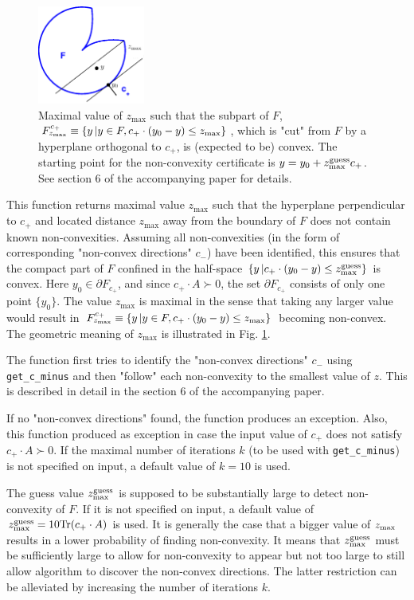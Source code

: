 \documentclass[a4paper]{article}
\theoremstyle{definition}
\begin{document}
\begin{enumerate}
\begin{figure}[H]
	\centering\includegraphics[width=100pt]{fig/get_z_max}
\captionsetup{width=.8\linewidth}
	\caption{Maximal value of $z_{\max}$ such that  the subpart of $F$, $F^{c_+}_{z_{\rm max}}\equiv \{y\, | y\in F, c_+ \cdot (y_0-y)\leq z_{\rm max}\}$, which is "cut" from $F$ by a hyperplane orthogonal  to $c_+$, is (expected to be) convex. The starting point for the non-convexity certificate is $y=y_0+z^{\rm guess}_{\rm max}c_+$. See section 6 of the accompanying paper for details.}
\label{fig:four}
\end{figure}


This function returns maximal value $z_{\max}$ such that the hyperplane perpendicular to $c_+$ and located distance $z_{\max}$ away from the boundary of $F$ does not contain known non-convexities. Assuming all non-convexities (in the form of corresponding "non-convex directions" $c_-$) have been identified, this ensures that the compact part of $F$ confined in the half-space $\{y\, |c_+ \cdot (y_0-y)\leq z^{\rm guess}_{\rm max}\}$ is convex.
Here $y_0\in \partial F_{c_+}$, and since $c_+\cdot A\succ 0$, the set $\partial F_{c_+}$ consists of only one point $\{y_0\}$.
The value $z_{\max}$ is maximal in the sense that taking any larger value would result in $F^{c_+}_{z_{\rm max}}\equiv \{y\, | y\in F, c_+ \cdot (y_0-y)\leq z_{\rm max}\}$ becoming non-convex. The geometric meaning of $z_{\max}$ is illustrated in Fig. \ref{fig:four}. 

The function first tries to identify the "non-convex directions" $c_-$ using {\tt get\_c\_minus} and then "follow" each non-convexity to the smallest value of $z$. This is described in detail in the section 6 of the accompanying paper.

If no "non-convex directions" found, the function produces an exception.
Also, this function produced as exception in case the input value of $c_+$ does not satisfy $c_+\cdot A\succ 0$.
If the maximal number of iterations $k$ (to be used with {\tt get\_c\_minus}) is not specified on input, a default value of $k=10$ is used.

The guess value $z^{\rm guess}_{\rm max}$ is supposed to be substantially large to detect non-convexity of $F$.
If it is not specified on input, a default value of $z^{\rm guess}_{\rm max}=10 {\rm Tr}(c_+\cdot A)$ is used.
It is generally the case that a bigger value of $z_{\rm max}$ results in a lower probability of finding non-convexity.
It means that $z_{\rm max}^{\rm guess}$ must be sufficiently large to allow for non-convexity to appear but not too large to still allow algorithm to discover the non-convex directions. The latter restriction can be alleviated by increasing the number of iterations $k$.


\end{enumerate}
\end{document}
